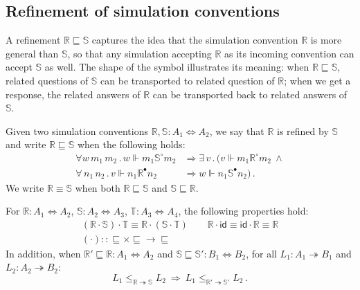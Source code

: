 \documentclass[sigplan,screen,review]{acmart}
\newcommand{\kw}[1]{\ensuremath{ \mathsf{#1} }}
\newcommand{\que}{\circ}
\newcommand{\ans}{\bullet}
\newcommand{\screfd}{\sqsubseteq}
\begin{document}

\subsection{Refinement of simulation conventions} \label{sec:scref} %

A refinement $\mathbb{R} \screfd \mathbb{S}$
captures the idea that the simulation convention $\mathbb{R}$
is more general than $\mathbb{S}$,
so that any simulation accepting $\mathbb{R}$ as its
incoming convention can accept $\mathbb{S}$ as well.
The shape of the symbol illustrates its meaning:
when $\mathbb{R} \screfd \mathbb{S}$,
related questions of $\mathbb{S}$ can be transported to
related question of $\mathbb{R}$;
when we get a response, the
related answers of $\mathbb{R}$ can be transported back to
related answers of $\mathbb{S}$.

\begin{definition} %
Given two simulation conventions
$\mathbb{R}, \mathbb{S} : A_1 \Leftrightarrow A_2$,
we say that
$\mathbb{R}$ is refined by $\mathbb{S}$ and write
$\mathbb{R} \screfd \mathbb{S}$
when the following holds:
\begin{align*}
  \forall w \, m_1 \, m_2 \,.\,
  w \Vdash m_1 \mathrel{\mathbb{S}^\que} m_2 &\Rightarrow
  \exists \, v \,.\, (
  v \Vdash m_1 \mathrel{\mathbb{R}^\que} m_2
  \: \wedge \\
  \forall \, n_1 \, n_2 \,.\,
  v \Vdash n_1 \mathrel{\mathbb{R}^\ans} n_2 &\Rightarrow
  w \Vdash n_1 \mathrel{\mathbb{S}^\ans} n_2) \,.
\end{align*}
We write $\mathbb{R} \equiv \mathbb{S}$ when both
$\mathbb{R} \screfd \mathbb{S}$ and
$\mathbb{S} \screfd \mathbb{R}$.
\end{definition}

\begin{theorem} \label{thm:sccomp} %
For
$\mathbb{R} : A_1 \Leftrightarrow A_2$,
$\mathbb{S} : A_2 \Leftrightarrow A_3$,
$\mathbb{T} : A_3 \Leftrightarrow A_4$,
the following properties hold:
\begin{gather*}
  (\mathbb{R} \cdot \mathbb{S}) \cdot \mathbb{T} \equiv
    \mathbb{R} \cdot (\mathbb{S} \cdot \mathbb{T})
  \qquad
  \mathbb{R} \cdot \kw{id} \equiv
  \kw{id} \cdot \mathbb{R} \equiv
  \mathbb{R}
  \\
  ({\cdot}) :: {{\screfd} \times {\screfd} \rightarrow {\screfd}}
\end{gather*}
In addition, when
$\mathbb{R}' \screfd \mathbb{R} : A_1 \Leftrightarrow A_2$ and
$\mathbb{S} \screfd \mathbb{S}' : B_1 \Leftrightarrow B_2$,
for all
$L_1 : A_1 \twoheadrightarrow B_1$ and $L_2 : A_2 \twoheadrightarrow B_2$:
\[
      L_1 \le_{\mathbb{R} \twoheadrightarrow \mathbb{S}} L_2
      \: \Rightarrow \:
      L_1 \le_{\mathbb{R}' \twoheadrightarrow \mathbb{S}'} L_2 \,.
\]
\end{theorem}
\end{document}
